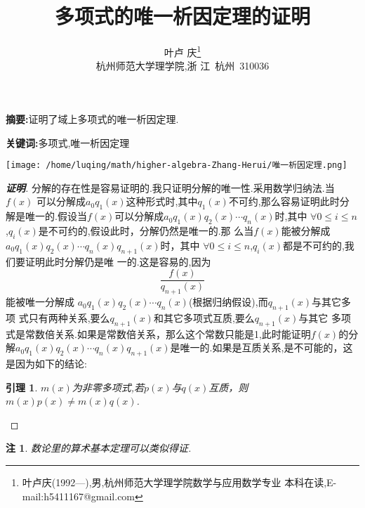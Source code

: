 \documentclass[twoside,11pt]{article}
\newtheorem{lemma}{引理}
\newtheorem{remark}{注}
\begin{document}
\title{\huge{\bf{多项式的唯一析因定理的证明}}} \author{\small{叶卢
    庆\footnote{叶卢庆(1992---),男,杭州师范大学理学院数学与应用数学专业
      本科在读,E-mail:h5411167@gmail.com}}\\{\small{杭州师范大学理学院,浙
      江~杭州~310036}}} \date{}
\maketitle



\textbf{\small{摘要}:}证明了域上多项式的唯一析因定理. \smallskip

\textbf{\small{关键词}:}多项式,唯一析因定理\smallskip


\vspace{30pt} %

\centering\texttt{[image: /home/luqing/math/higher-algebra-Zhang-Herui/唯一析因定理.png]}  
\begin{proof}[\textbf{证明}]
分解的存在性是容易证明的.我只证明分解的唯一性.采用数学归纳法.当$f(x)$
可以分解成$a_0q_1(x)$这种形式时,其中$q_1(x)$不可约,那么容易证明此时分
解是唯一的.假设当$f(x)$可以分解成$a_0q_1(x)q_2(x)\cdots q_n(x)$时,其中
$\forall 0\leq i\leq n$,$q_i(x)$是不可约的,假设此时，分解仍然是唯一的.那
么当$f(x)$能被分解成$a_0q_1(x)q_2(x)\cdots q_n(x)q_{n+1}(x)$时，其中
$\forall 0\leq i\leq n$,$q_i(x)$都是不可约的,我们要证明此时分解仍是唯
一的.这是容易的,因为$$\frac{f(x)}{q_{n+1}(x)}$$能被唯一分解成
$a_0q_1(x)q_2(x)\cdots q_n(x)$(根据归纳假设),而$q_{n+1}(x)$与其它多项
式只有两种关系,要么$q_{n+1}(x)$和其它多项式互质,要么$q_{n+1}(x)$与其它
多项式是常数倍关系.如果是常数倍关系，那么这个常数只能是1,此时能证明$f(x)$的分解$a_0q_1(x)q_2(x)\cdots q_n(x)q_{n+1}(x)$是唯一的.如果是互质关系,是不可能的，这是因为如下的结论:
\begin{lemma}
  $m(x)$为非零多项式,若$p(x)$与$q(x)$互质，则$m(x)p(x)\neq m(x)q(x)$.
\end{lemma}
\end{proof}
\begin{remark}
  数论里的算术基本定理可以类似得证.
\end{remark}

\end{document}
